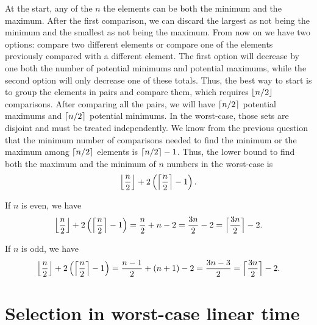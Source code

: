 \begin{enumerate}
\begin{framed}
At the start, any of the $n$ the elements can be both the minimum and the
maximum. After the first comparison, we can discard the largest as not being the
minimum and the smallest as not being the maximum. From now on we have two
options: compare two different elements or compare one of the elements
previously compared with a different element. The first option will decrease by
one both the number of potential minimums and potential maximums, while the
second option will only decrease one of these totals. Thus, the best way to
start is to group the elements in pairs and compare them, which requires
$\lfloor n/2\rfloor$ comparisons. After comparing all the pairs, we will have
$\lceil n/2\rceil$ potential maximums and $\lceil n/2\rceil$ potential minimums. In the
worst-case, those sets are disjoint and must be treated independently. We know
from the previous question that the minimum number of comparisons needed to find
the minimum or the maximum among $\lceil n/2\rceil$ elements is $\lceil n/2\rceil - 1$.
Thus, the lower bound to find both the maximum and the minimum of $n$ numbers in
the worst-case is
\[
  \Bigl\lfloor \frac{n}{2} \Bigr\rfloor + 2 \left( \Bigl\lceil \frac{n}{2} \Bigr\rceil - 1 \right).
\]

If $n$ is even, we have
\[
  \Bigl\lfloor \frac{n}{2} \Bigr\rfloor + 2 \left( \Bigl\lceil \frac{n}{2} \Bigr\rceil - 1 \right)
  = \frac{n}{2} + n - 2
  = \frac{3n}{2} - 2
  = \Bigl\lceil \frac{3n}{2} \Bigr\rceil - 2.
\]

If $n$ is odd, we have
\[
  \Bigl\lfloor \frac{n}{2} \Bigr\rfloor + 2 \left( \Bigl\lceil \frac{n}{2} \Bigr\rceil - 1 \right)
  = \frac{n - 1}{2} + (n + 1) - 2
  = \frac{3n - 3}{2}
  = \Bigl\lceil \frac{3n}{2} \Bigr\rceil - 2.
\]
\end{framed}

\end{enumerate}

\newpage

\section{Selection in worst-case linear time}

